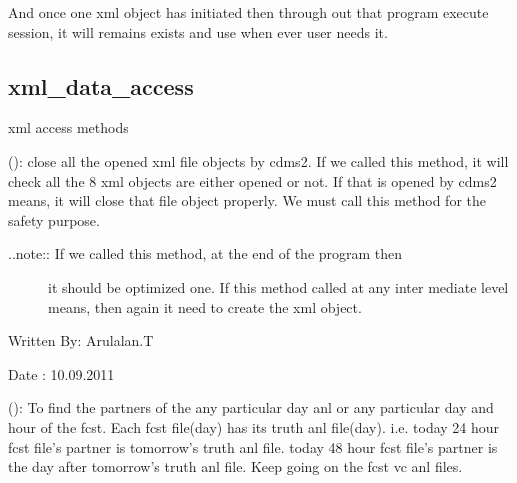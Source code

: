 \documentclass[letterpaper,10pt,english]{sphinxmanual}
\begin{document}
And once one xml object has initiated then through out that program execute session, it will remains exists and use when ever user needs it.


\subsection{xml\_data\_access}
\label{diagnosisutils:xml-data-access}\label{diagnosisutils:id1}\label{diagnosisutils:module-xml_data_access}

\begin{fulllineitems}
\label{diagnosisutils:xml_data_access.GribXmlAccess}
xml access methods

\begin{fulllineitems}
\label{diagnosisutils:xml_data_access.GribXmlAccess.closeXmlObjs}
{\hyperref[diagnosisutils:xml_data_access.GribXmlAccess.closeXmlObjs]{}} (): close all the opened xml file objects by
cdms2. If we called this method, it will check all the 8 xml objects
are either opened or not. If that is opened by cdms2 means, it will
close that file object properly. We must call this method for the
safety purpose.
\begin{description}
\item[{..note:: If we called this method, at the end of the program then}] \leavevmode
it should be optimized one. If this method called at any inter
mediate level means, then again it need to create the xml object.

\end{description}

Written By: Arulalan.T

Date : 10.09.2011

\end{fulllineitems}


\begin{fulllineitems}
\label{diagnosisutils:xml_data_access.GribXmlAccess.findPartners}
{\hyperref[diagnosisutils:xml_data_access.GribXmlAccess.findPartners]{}} (): To find the partners of the any particular
day anl or any particular day and hour of the fcst.
Each fcst file(day) has its truth anl file(day).
i.e. today 24 hour fcst file's partner is tomorrow's truth anl file.
today 48 hour fcst file's partner is the day after tomorrow's
truth anl file. Keep going on the fcst vc anl files.


\end{fulllineitems}
\end{fulllineitems}
\end{document}
